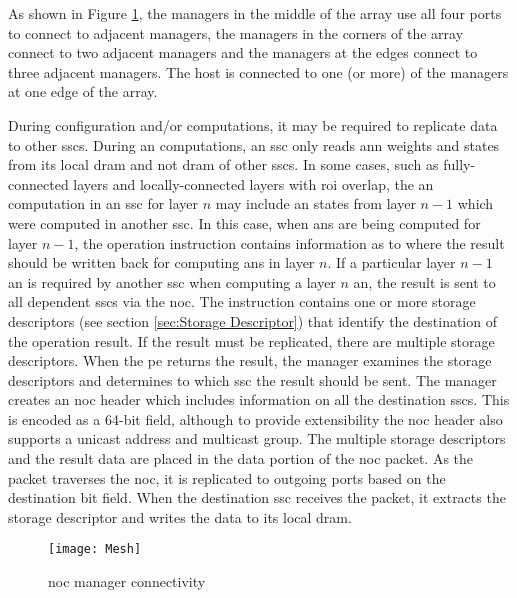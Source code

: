 As shown in Figure \ref{fig:Mesh}, the managers in the middle of the array use all four ports to connect to adjacent managers, the managers in the corners of the array connect to two adjacent managers and the managers at the edges connect to three adjacent managers.
The host is connected to one (or more) of the managers at one edge of the array. 

During configuration and/or computations, it may be required to replicate data to other \acp{ssc}.
During \ac{an} computations, an \ac{ssc} only reads \ac{ann} weights and states from its local \ac{dram} and not \ac{dram} of other \acp{ssc}.
In some cases, such as fully-connected layers and locally-connected layers with \ac{roi} overlap, the \ac{an} computation in an \ac{ssc} for layer $n$ may include \ac{an} states from layer $n-1$ which were computed in another \ac{ssc}.
In this case, when \acp{an} are being computed for layer $n-1$, the operation instruction contains information as to where the result should be written back for computing \acp{an} in layer $n$.
If a particular layer $n-1$ \ac{an} is required by another \ac{ssc} when computing a layer $n$ \ac{an}, the result is sent to all dependent \acp{ssc} via the \ac{noc}.
The instruction contains one or more storage descriptors (see section \ref{sec:Storage Descriptor}) that identify the destination of the operation result.
If the result must be replicated, there are multiple storage descriptors. When the \ac{pe} returns the result, the manager examines the storage descriptors and determines to which \ac{ssc} the result should be sent.
The manager creates an \ac{noc} header which includes information on all the destination \acp{ssc}. 
This is encoded as a 64-bit field, although to provide extensibility the \ac{noc} header also supports a unicast address and multicast group. 
The multiple storage descriptors and the result data are placed in the data portion of the \ac{noc} packet.
As the packet traverses the \ac{noc}, it is replicated to outgoing ports based on the destination bit field.
When the destination \ac{ssc} receives the packet, it extracts the storage descriptor and writes the data to its local \ac{dram}.

\begin{figure}[!t]
\centering
\captionsetup{justification=centering}
\centerline{
\mbox{\texttt{[image: Mesh]}}
}
\caption{\ac{noc} manager connectivity}
\label{fig:Mesh}
\end{figure}

